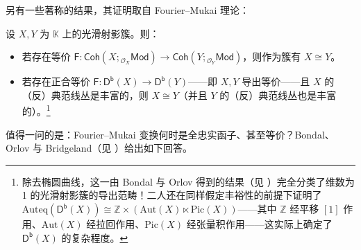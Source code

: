 
另有一些著称的结果，其证明取自 Fourier--Mukai 理论：

\begin{Pro}\label{whenprojvarareequiv}
	设 $X,Y$ 为 $\mathbb{K}$ 上的光滑射影簇。则：
	\begin{itemize}[leftmargin=0.5cm]
		\item 若存在等价 $\mathsf{F}:\mathsf{Coh}(X;{}_{\mathcal{O}_X}\!\mathsf{Mod})\rightarrow \mathsf{Coh}(Y;{}_{\mathcal{O}_Y}\!\mathsf{Mod})$，则作为簇有 $X\cong Y$。

		\item 若存在正合等价 $\mathsf{F}:\mathsf{D^b}(X)\!\rightarrow\! \mathsf{D^b}(Y)$——即 $X, Y$ 导出等价——且 $X$ 的（反）典范线丛是丰富的，则 $X\cong Y$（并且 $Y$ 的（反）典范线丛也是丰富的）。\footnote{除去椭圆曲线，这一由 Bondal 与 Orlov 得到的结果（见 \cite{[BO97]}）完全分类了维数为 1 的光滑射影簇的导出范畴！二人还在同样假定丰裕性的前提下证明了 $\text{Auteq}(\mathsf{D^b}(X))\cong\mathbb{Z}\times(\text{Aut}(X)\ltimes\text{Pic}(X))$——其中 $\mathbb{Z}$ 经平移 $[1]$ 作用、$\text{Aut}(X)$ 经拉回作用、$\text{Pic}(X)$ 经张量积作用——这实际上确定了 $\mathsf{D^b}(X)$ 的复杂程度。}
	\end{itemize}
\end{Pro}

值得一问的是：Fourier--Mukai 变换何时是全忠实函子、甚至等价？Bondal、Orlov 与 Bridgeland（见 \cite{[Bri98]}）给出如下回答。

